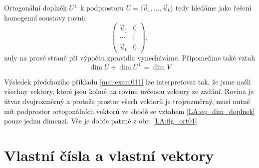       Ortogonální doplněk \(U^\bot\) k podprostoru \(U = \langle\vec{u}_1,\ldots,\vec{u}_k\rangle\) 
      tedy hledáme jako řešení homogenní soustavy rovnic
      \begin{equation*}
        \left(
          \begin{array}{c|c}
            \vec{u}_1  &   0      \\
            \cdots     &  \vdots  \\
            \vec{u}_k  &   0
          \end{array}
        \right),
      \end{equation*}
      nuly na pravé straně při výpočtu zpravidla vynecháváme. Připomeňme také vztah
      \begin{equation}\label{LA:eq_dim_doplnek}
        \dim U + \dim U^\bot = \dim V
      \end{equation}

        

      Výsledek předchozího příkladu \ref{mai:exam011} lze interpretovat tak, že jsme našli všechny 
      vektory, které jsou kolmé na rovinu určenou vektory ze zadání. Rovina je útvar       
      dvojrozměrný a protože prostor všech vektorů je trojrozměrný, musí nutně mít podprostor 
      ortogonálních vektorů ve shodě se vztahem \ref{LA:eq_dim_doplnek} pouze jednu dimenzi. Vše 
      je dobře patrné z obr. \ref{LA:fig_ort01}

  \section{Vlastní čísla a vlastní vektory}\label{mai:IIchapIsecIII}
